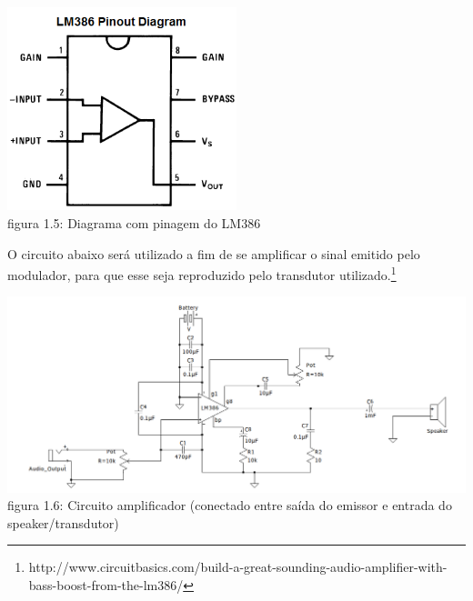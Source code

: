 \documentclass[11pt,a4paper]{report}
\begin{document}
\begin{center}
	\includegraphics[width=0.5\textwidth]{LM386_pinout_diagram.png}\\
	\footnotesize{figura 1.5: Diagrama com pinagem do LM386}
\end{center}

O circuito abaixo será utilizado a fim de se amplificar o sinal emitido pelo modulador, para que esse seja reproduzido pelo transdutor utilizado.\footnote{http://www.circuitbasics.com/build-a-great-sounding-audio-amplifier-with-bass-boost-from-the-lm386/}\\

\begin{center}
	\includegraphics[width=\linewidth]{amplifier_circuit.png}\\
	\footnotesize{figura 1.6: Circuito amplificador (conectado entre saída do emissor e entrada do speaker/transdutor)}
\end{center}
\end{document}

